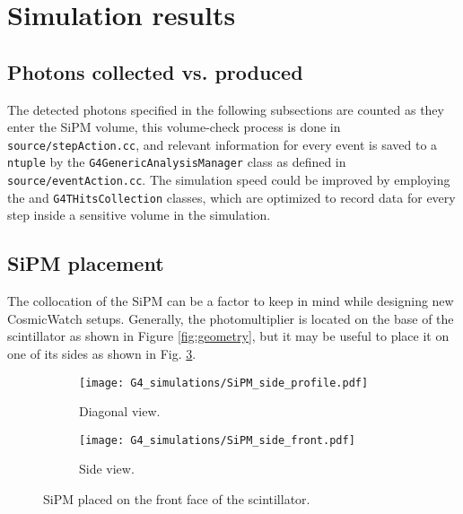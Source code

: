 \section{Simulation results}

\subsection{Photons collected vs. produced}\label{sec:collected_produced}

The detected photons specified in the following subsections are counted as they enter the SiPM volume, this volume-check process is done in \texttt{source/stepAction.cc}, and relevant information for every event is saved to a \texttt{ntuple} by the \texttt{G4GenericAnalysisManager} class as defined in \texttt{source/eventAction.cc}. The simulation speed could be improved by employing the  and \texttt{G4THitsCollection} classes, which are optimized to record data for every step inside a sensitive volume in the simulation.

\subsection{SiPM placement}\label{sec:SiPM_placement}

The collocation of the SiPM can be a factor to keep in mind while designing new CosmicWatch setups. Generally, the photomultiplier is located on the base of the scintillator as shown in Figure \ref{fig:geometry}, but it may be useful to place it on one of its sides as shown in Fig. \ref{fig:SiPM_side}.

\begin{figure}[H]
  \centering
  \begin{subfigure}[t]{0.48\textwidth}
    \texttt{[image: G4\_simulations/SiPM\_side\_profile.pdf]}
    \caption{\label{sfig:SiPM_side_profile}Diagonal view.}
  \end{subfigure}
  \hfill
  \begin{subfigure}[t]{0.48\textwidth}
    \texttt{[image: G4\_simulations/SiPM\_side\_front.pdf]}
    \caption{\label{sfig:SiPM_side_front}Side view.}
  \end{subfigure}
  \caption{\label{fig:SiPM_side}SiPM placed on the front face of the scintillator.}
\end{figure}

